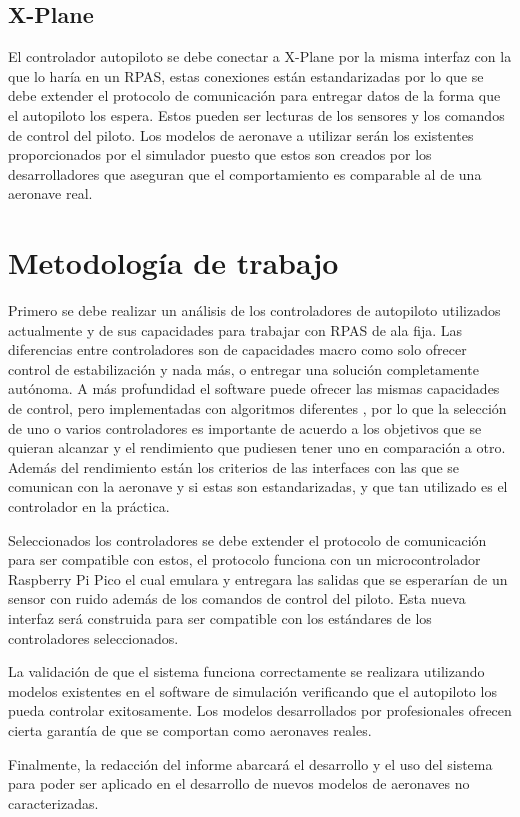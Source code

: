 \subsection{X-Plane}

El controlador autopiloto se debe conectar a X-Plane por la misma interfaz con la que lo haría en un RPAS, estas conexiones están estandarizadas por lo que se debe extender el protocolo de comunicación para entregar datos de la forma que el autopiloto los espera. Estos pueden ser lecturas de los sensores y los comandos de control del piloto. Los modelos de aeronave a utilizar serán los existentes proporcionados por el simulador puesto que estos son creados por los desarrolladores que aseguran que el comportamiento es comparable al de una aeronave real.

\section{Metodología de trabajo}

Primero se debe realizar un análisis de los controladores de autopiloto utilizados actualmente y de sus capacidades para trabajar con RPAS de ala fija. Las diferencias entre controladores son de capacidades macro como solo ofrecer control de estabilización y nada más, o entregar una solución completamente autónoma. A más profundidad el software puede ofrecer las mismas capacidades de control, pero implementadas con algoritmos diferentes \cite{ardupilot-vs-betaflight-vs-inav}, por lo que la selección de uno o varios controladores es importante de acuerdo a los objetivos que se quieran alcanzar y el rendimiento que pudiesen tener uno en comparación a otro. Además del rendimiento están los criterios de las interfaces con las que se comunican con la aeronave y si estas son estandarizadas, y que tan utilizado es el controlador en la práctica.

Seleccionados los controladores se debe extender el protocolo de comunicación para ser compatible con estos, el protocolo funciona con un microcontrolador Raspberry Pi Pico el cual emulara y entregara las salidas que se esperarían de un sensor con ruido además de los comandos de control del piloto. Esta nueva interfaz será construida para ser compatible con los estándares de los controladores seleccionados.

La validación de que el sistema funciona correctamente se realizara utilizando modelos existentes en el software de simulación verificando que el autopiloto los pueda controlar exitosamente. Los modelos desarrollados por profesionales ofrecen cierta garantía de que se comportan como aeronaves reales.

Finalmente, la redacción del informe abarcará el desarrollo y el uso del sistema para poder ser aplicado en el desarrollo de nuevos modelos de aeronaves no caracterizadas.